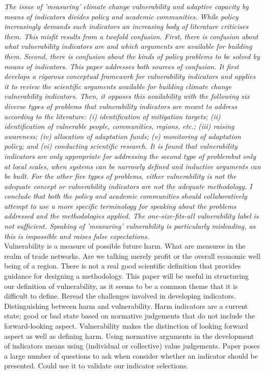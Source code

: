 \textit{The issue of 'measuring' climate change vulnerability and adaptive capacity by means of indicators divides policy and academic communities. While policy increasingly demands such indicators an increasing body of literature criticises them. This misfit results from a twofold confusion. First, there is confusion about what vulnerability indicators are and which arguments are available for building them. Second, there is confusion about the kinds of policy problems to be solved by means of indicators. This paper addresses both sources of confusion. It first develops a rigorous conceptual framework for vulnerability indicators and applies it to review the scientific arguments available for building climate  change vulnerability indicators. Then, it opposes this availability with the following six diverse types of problems that vulnerability indicators are meant to address according to the literature: (i) identification of mitigation targets; (ii) identification of vulnerable people, communities, regions, etc.; (iii) raising awareness; (iv) allocation of adaptation funds; (v) monitoring of adaptation policy; and (vi) conducting scientific research. It is found that vulnerability indicators are only appropriate for addressing the second type of problembut only at local scales, when systems can be narrowly defined and inductive arguments can be built. For the other five types of problems, either vulnerability is not the adequate concept or vulnerability indicators are not the adequate methodology. I conclude that both the policy and academic communities should collaboratively attempt to use a more specific terminology for speaking about the problems addressed and the methodologies applied. The one-size-fits-all vulnerability label is not sufficient. Speaking of 'measuring' vulnerability is particularly misleading, as this is impossible and raises false expectations.}\\
Vulnerability is a measure of possible future harm. What are measures in the realm of trade networks. Are we talking merely profit or the overall economic well being of a region. There is not a real good scientific definition that provides guidance for designing a methodology. This paper will be useful in structuring our definition of vulnerability, as it seems to be a common theme that it is difficult to define. Reread the challenges involved in developing indicators. Distinguishing between harm and vulnerability. Harm indicators are a current state; good or bad state based on normative judgements that do not include the forward-looking aspect. Vulnerability makes the distinction of looking forward aspect as well as defining harm. Using normative arguments in the development of indicators means using (individual or collective) value judgements. Paper poses a large number of questions to ask when consider whether an indicator should be presented. Could use it to validate our indicator selections.\\
